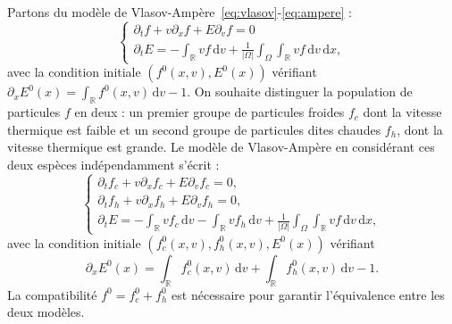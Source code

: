 Partons du modèle de Vlasov-Ampère~\eqref{eq:vlasov}-\eqref{eq:ampere} :
$$
  \begin{cases}
    \partial_t f + v\partial_x f + E\partial_v f = 0 \\
    \partial_t E = -\int_{\mathbb{R}} vf\,\mathrm{d}v+ \frac{1}{|\Omega|}\int_\Omega \int_{\mathbb{R}} vf\,\mathrm{d}v \,\mathrm{d}x,
  \end{cases}
$$
avec la condition initiale $(f^0(x, v), E^0(x))$ vérifiant $\partial_x E^{0}(x) = \int_{\mathbb{R}} f^0(x, v)\,\mathrm{d}v-1$. On souhaite distinguer la population de particules $f$ en deux : un premier groupe de particules froides $f_c$ dont la vitesse thermique est faible et un second groupe de particules dites chaudes $f_h$, dont la vitesse thermique est grande. Le modèle de Vlasov-Ampère en considérant ces deux espèces indépendamment s'écrit :
$$
  \begin{cases}
    \partial_t f_c + v\partial_x f_c + E\partial_v f_c = 0,  \\
    \partial_t f_h + v\partial_x f_h + E\partial_v f_h = 0,  \\
    \partial_t E = -\int_{\mathbb{R}} vf_c\,\mathrm{d}v -\int_{\mathbb{R}} vf_h\,\mathrm{d}v+ \frac{1}{|\Omega|}\int_\Omega \int_{\mathbb{R}} vf\,\mathrm{d}v \,\mathrm{d}x, 
  \end{cases}
$$
avec la condition initiale $(f^0_{c}(x, v), f^0_{h}(x, v), E^0(x))$ vérifiant
$$
\partial_x E^0(x) = \int_{\mathbb{R}} f^0_{c}(x, v)\,\mathrm{d}v+\int_{\mathbb{R}} f^0_{h}(x, v)\,\mathrm{d}v-1.
$$ 
La compatibilité $f^0 = f^0_{c} + f^0_{h}$ est nécessaire pour garantir l'équivalence entre les deux modèles.

